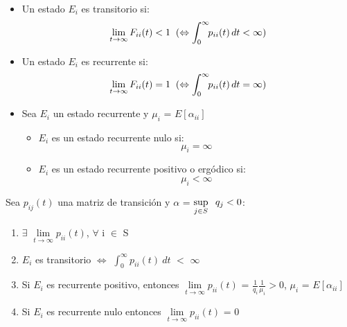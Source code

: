 \documentclass[12pt,a4paper]{article}
\begin{document}
   \begin{itemize}
   	\item Un estado $E_{i}$ es transitorio si:
   	\begin{equation*}
   	\lim\limits_{t\rightarrow \infty}F_{ii}(t)<1
   	\\
   	\hspace{0.2cm} (\Leftrightarrow \int_0^\infty\!\!p_{ii}(t)\,dt<\infty)
   	\end{equation*}
   	\item  Un estado $E_{i}$ es recurrente si:
   	\begin{equation*}
   		\lim\limits_{t\rightarrow \infty}F_{ii}(t)=1
   		\\
   		\hspace{0.2cm} (\Leftrightarrow \int_0^\infty\!\!p_{ii}(t)\,dt=\infty)
   	\end{equation*}
   	\item Sea $E_{i}$ un estado recurrente y $\mu_{i}$ = $E[\alpha_{ii}]$
   	\\
   	   	\begin{itemize}
   		\item $E_{i}$ es un estado recurrente nulo si:
   		\begin{equation*}
   		\mu_{i}= \infty
   		\end{equation*}
   		\item $E_{i}$ es un estado recurrente positivo o ergódico si:
   		\begin{equation*}
   		\mu_{i}< \infty
   		\end{equation*}
   	\end{itemize}
   \end{itemize}
      \begin{theorem}
   	Sea $p_{ij}(t)$	una matriz de transición y $\alpha$ = $\sup\limits_{j\in S} \hspace{0.2cm} q_j <0$:
   	\begin{enumerate}
   		\item $\exists$ $\lim\limits_{t\rightarrow \infty} p_{ii}(t)$, $\forall$ i $\in$ S
   		\item $E_{i}$ es transitorio $\Longleftrightarrow$ $\int_0^\infty\!\!p_{ii}(t)\ dt $ $<$ $\infty$
   		\item Si $E_{i}$ es recurrente positivo, entonces $\lim\limits_{t\rightarrow \infty} p_{ii}(t)$ = $\frac{1}{q_{i}}$$\frac{1}{\mu_{i}}$$>$0, $\mu_{i}$ = $E[\alpha_{ii}]$
   		\item Si $E_{i}$ es recurrente nulo	entonces $\lim\limits_{t\rightarrow \infty} p_{ii}(t)$ = 0
   		\end{enumerate}
   		   	
      \end{theorem}
      
\end{document}
